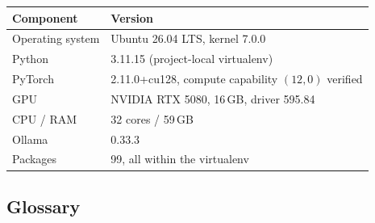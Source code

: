\begin{center}
\renewcommand{\arraystretch}{1.2}
\begin{tabular}{@{}l l@{}}
\toprule
\textbf{Component} & \textbf{Version} \\
\midrule
Operating system & Ubuntu 26.04 LTS, kernel 7.0.0 \\
Python & 3.11.15 (project-local virtualenv) \\
PyTorch & 2.11.0+cu128, compute capability $(12,0)$ verified \\
GPU & NVIDIA RTX 5080, 16\,GB, driver 595.84 \\
CPU / RAM & 32 cores / 59\,GB \\
Ollama & 0.33.3 \\
Packages & 99, all within the virtualenv \\
\bottomrule
\end{tabular}
\end{center}

\subsection{Glossary}

